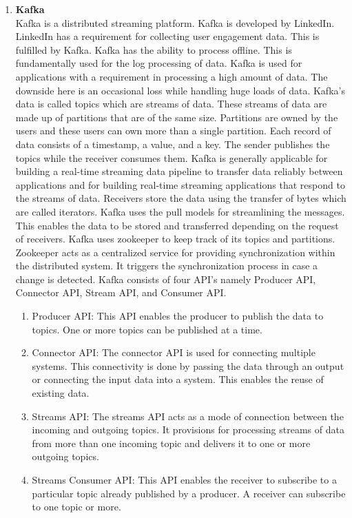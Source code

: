 \documentclass{IEEEtran}
\begin{document}
\begin{enumerate}
    \item \textbf{Kafka}\\ Kafka is a distributed streaming platform. Kafka is developed by LinkedIn. LinkedIn has a requirement for collecting user engagement data. This is fulfilled by Kafka. Kafka has the ability to process offline. This is fundamentally used for the log processing of data. Kafka is used for applications with a requirement in processing a high amount of data. The downside here is an occasional loss while handling huge loads of data. Kafka’s data is called topics which are streams of data. These streams of data are made up of partitions that are of the same size. Partitions are owned by the users and these users can own more than a single partition. Each record of data consists of a timestamp, a value, and a key. The sender publishes the topics while the receiver consumes them. Kafka is generally applicable for building a real-time streaming data pipeline to transfer data reliably between applications and for building real-time streaming applications that respond to the streams of data. Receivers store the data using the transfer of bytes which are called iterators. Kafka uses the pull models for streamlining the messages. This enables the data to be stored and transferred depending on the request of receivers. Kafka uses zookeeper to keep track of its topics and partitions. Zookeeper acts as a centralized service for providing synchronization within the distributed system. It triggers the synchronization process in case a change is detected. Kafka consists of four API’s namely Producer API, Connector API, Stream API, and Consumer API. \cite{KafkaVersion}
    \begin{enumerate}
        \item Producer API: This API enables the producer to publish the data to topics. One or more topics can be published at a time. \cite{KafkaVersion}
        \item Connector API: The connector API is used for connecting multiple systems. This connectivity is done by passing the data through an output or connecting the input data into a system. This enables the reuse of existing data. \cite{KafkaVersion}
        \item Streams API: The streams API acts as a mode of connection between the incoming and outgoing topics. It provisions for processing streams of data from more than one incoming topic and delivers it to one or more outgoing topics. \cite{KafkaVersion}
        \item Streams Consumer API: This API enables the receiver to subscribe to a particular topic already published by a producer. A receiver can subscribe to one topic or more. \cite{KafkaVersion}

\end{enumerate}
\end{enumerate}
\end{document}
